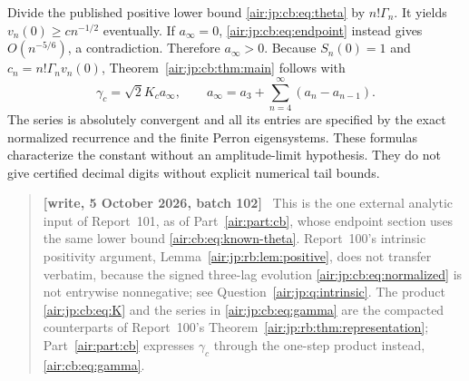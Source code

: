 \documentclass[11pt,letterpaper]{article}
\numberwithin{equation}{section}
\theoremstyle{remark}
\newenvironment{writenotejp}{\par\smallskip\begin{quote}\small\textbf{[write, 5 October 2026, batch 102]}\ }{\end{quote}\smallskip}
\begin{document}
Divide the published positive lower bound \eqref{air:jp:cb:eq:theta} by $n!\Gamma_n$. It yields $v_n(0)\ge c n^{-1/2}$ eventually. If $a_\infty=0$, \eqref{air:jp:cb:eq:endpoint} instead gives $O(n^{-5/6})$, a contradiction. Therefore $a_\infty>0$. Because $S_n(0)=1$ and $c_n=n!\Gamma_nv_n(0)$, Theorem~\ref{air:jp:cb:thm:main} follows with
\begin{equation}\label{air:jp:cb:eq:gamma}
 \gamma_c=\sqrt2K_ca_\infty,\qquad
 a_\infty=a_3+\sum_{n=4}^\infty(a_n-a_{n-1}).
\end{equation}
The series is absolutely convergent and all its entries are specified by the exact normalized recurrence and the finite Perron eigensystems. These formulas characterize the constant without an amplitude-limit hypothesis. They do not give certified decimal digits without explicit numerical tail bounds.
\begin{writenotejp}
This is the one external analytic input of Report~101, as of Part~\ref{air:part:cb}, whose endpoint section uses the same lower bound \eqref{air:cb:eq:known-theta}. Report~100's intrinsic positivity argument, Lemma~\ref{air:jp:rb:lem:positive}, does not transfer verbatim, because the signed three-lag evolution \eqref{air:jp:cb:eq:normalized} is not entrywise nonnegative; see Question~\ref{air:jp:q:intrinsic}. The product \eqref{air:jp:cb:eq:K} and the series in \eqref{air:jp:cb:eq:gamma} are the compacted counterparts of Report~100's Theorem~\ref{air:jp:rb:thm:representation}; Part~\ref{air:part:cb} expresses $\gamma_c$ through the one-step product instead, \eqref{air:cb:eq:gamma}.
\end{writenotejp}
\end{document}
